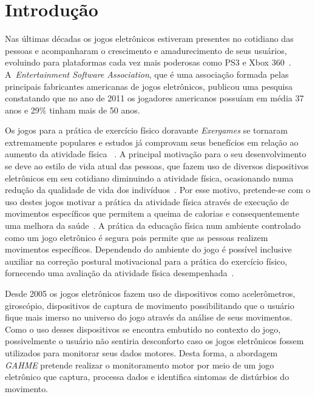 \chapter{Introdu\c{c}\~{a}o} \label{chapter:intro}
Nas últimas décadas os jogos eletrônicos estiveram presentes no cotidiano das pessoas e acompanharam o crescimento e amadurecimento de seus usuários, evoluindo para plataformas cada vez mais poderosas como PS3 e Xbox 360~\cite{moore2011basics}. A~\textit{Entertainment Software Association}, que é uma associação formada pelas principais fabricantes americanas de jogos eletrônicos, publicou uma pesquisa constatando que no ano de 2011 os jogadores americanos possuíam em média 37 anos e 29$\%$ tinham mais de 50 anos.

Os jogos para a prática de exercício físico doravante \textit{Exergames} se tornaram extremamente populares e estudos já comprovam seus benefícios em relação ao aumento da atividade física ~\cite{baran08}. A principal motivação para o seu desenvolvimento se deve ao estilo de vida atual das pessoas, que fazem uso de diversos dispositivos eletrônicos em seu cotidiano diminuindo a atividade física, ocasionando numa redução da qualidade de vida dos indivíduos~\cite{maitland}. Por esse motivo, pretende-se com o uso destes jogos motivar a prática da atividade física através de execução de movimentos específicos que permitem a queima de calorias e consequentemente uma melhora da saúde~\cite{Suhonen:2008:SFE:1457199.1457204}. A prática da educação física num ambiente controlado como um jogo eletrônico é segura pois permite que as pessoas realizem movimentos específicos. Dependendo do ambiente do jogo é possível inclusive auxiliar na correção postural motivacional para a prática do exercício físico, fornecendo uma avaliação da atividade física desempenhada~\cite{Hardy2011,vaghetti2011,Suhonen:2008:SFE:1457199.1457204}.  %

Desde 2005 os jogos eletrônicos fazem uso de dispositivos como acelerômetros, giroscópio, dispositivos de captura de movimento possibilitando que o usuário fique mais imerso no universo do jogo através da análise de seus movimentos. Como o uso desses dispositivos se encontra embutido no contexto do jogo, possivelmente o usuário não sentiria desconforto caso os jogos eletrônicos fossem utilizados para monitorar seus dados motores. Desta forma, a abordagem \textit{GAHME} pretende realizar o monitoramento motor por meio de um jogo eletrônico que captura, processa dados e identifica sintomas de distúrbios do movimento.

